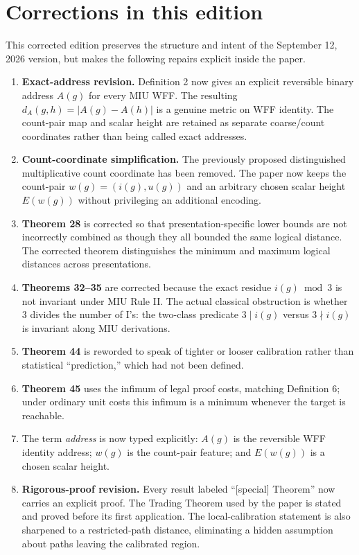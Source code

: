 \documentclass[11pt]{article}
\begin{document}
\section*{Corrections in this edition}
This corrected edition preserves the structure and intent of the September 12, 2026 version, but makes the following repairs explicit inside the paper.
\begin{enumerate}[leftmargin=1.7em]
\item \textbf{Exact-address revision.} Definition 2 now gives an explicit reversible binary address $A(g)$ for every MIU WFF. The resulting $d_A(g,h)=|A(g)-A(h)|$ is a genuine metric on WFF identity. The count-pair map and scalar height are retained as separate coarse/count coordinates rather than being called exact addresses.
\item \textbf{Count-coordinate simplification.} The previously proposed distinguished multiplicative count coordinate has been removed. The paper now keeps the count-pair $w(g)=(i(g),u(g))$ and an arbitrary chosen scalar height $E(w(g))$ without privileging an additional encoding.
\item \textbf{Theorem 28} is corrected so that presentation-specific lower bounds are not incorrectly combined as though they all bounded the same logical distance. The corrected theorem distinguishes the minimum and maximum logical distances across presentations.
\item \textbf{Theorems 32--35} are corrected because the exact residue $i(g)\bmod 3$ is not invariant under MIU Rule II. The actual classical obstruction is whether $3$ divides the number of I's: the two-class predicate $3\mid i(g)$ versus $3\nmid i(g)$ is invariant along MIU derivations.
\item \textbf{Theorem 44} is reworded to speak of tighter or looser calibration rather than statistical ``prediction,'' which had not been defined.
\item \textbf{Theorem 45} uses the infimum of legal proof costs, matching Definition 6; under ordinary unit costs this infimum is a minimum whenever the target is reachable.
\item The term \emph{address} is now typed explicitly: $A(g)$ is the reversible WFF identity address; $w(g)$ is the count-pair feature; and $E(w(g))$ is a chosen scalar height.
\item \textbf{Rigorous-proof revision.} Every result labeled ``[special] Theorem'' now carries an explicit proof. The Trading Theorem used by the paper is stated and proved before its first application. The local-calibration statement is also sharpened to a restricted-path distance, eliminating a hidden assumption about paths leaving the calibrated region.
\end{enumerate}
\end{document}
